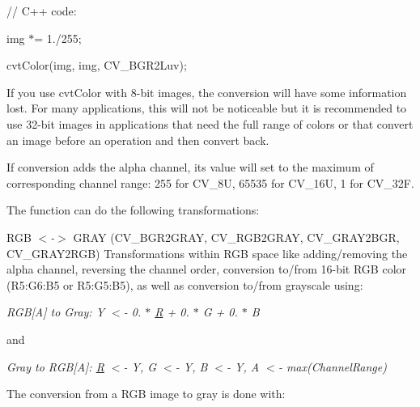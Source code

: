 {\ttfamily }

{\ttfamily }

{\ttfamily // C++ code\+:}

{\ttfamily }

{\ttfamily }

{\ttfamily img $\ast$= 1./255;}

{\ttfamily }

{\ttfamily }

{\ttfamily cvt\+Color(img, img, C\+V\+\_\+\+B\+G\+R2\+Luv);}

{\ttfamily }

{\ttfamily }

{\ttfamily If you use {\ttfamily cvt\+Color} with 8-\/bit images, the conversion will have some information lost. For many applications, this will not be noticeable but it is recommended to use 32-\/bit images in applications that need the full range of colors or that convert an image before an operation and then convert back. }

If conversion adds the alpha channel, its value will set to the maximum of corresponding channel range\+: 255 for {\ttfamily C\+V\+\_\+8U}, 65535 for {\ttfamily C\+V\+\_\+16U}, 1 for {\ttfamily C\+V\+\_\+32F}.

The function can do the following transformations\+:


\begin{DoxyItemize}
\item R\+GB {\itshape $<$-\/$>$} G\+R\+AY ({\ttfamily C\+V\+\_\+\+B\+G\+R2\+G\+R\+AY, C\+V\+\_\+\+R\+G\+B2\+G\+R\+AY, C\+V\+\_\+\+G\+R\+A\+Y2\+B\+GR, C\+V\+\_\+\+G\+R\+A\+Y2\+R\+GB}) Transformations within R\+GB space like adding/removing the alpha channel, reversing the channel order, conversion to/from 16-\/bit R\+GB color (R5\+:\+G6\+:B5 or R5\+:\+G5\+:B5), as well as conversion to/from grayscale using\+: 
\end{DoxyItemize}

{\itshape R\+GB\mbox{[}A\mbox{]} to Gray\+: Y $<$-\/ 0. $\ast$ \mbox{\hyperlink{classorg_1_1opencv_1_1_r}{R}} + 0. $\ast$ G + 0. $\ast$ B}

and

{\itshape Gray to R\+GB\mbox{[}A\mbox{]}\+: \mbox{\hyperlink{classorg_1_1opencv_1_1_r}{R}} $<$-\/ Y, G $<$-\/ Y, B $<$-\/ Y, A $<$-\/ max(\+Channel\+Range)}

The conversion from a R\+GB image to gray is done with\+:

{\ttfamily }

{\ttfamily }

